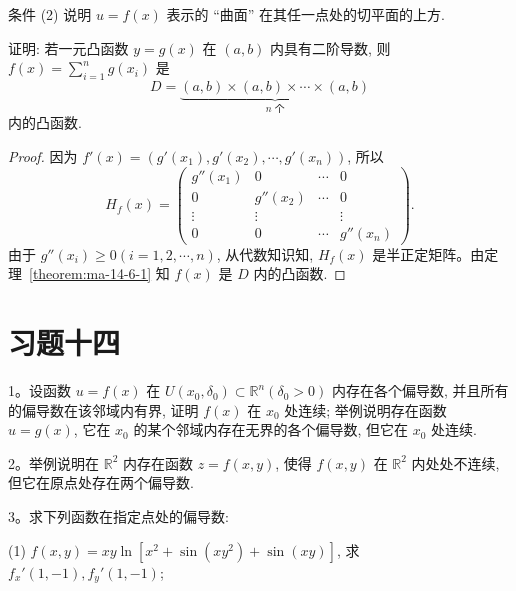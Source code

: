 \begin{remark}\label{remark:ma-14-source-122}
条件 (2) 说明 $u=f(x)$ 表示的 ``曲面'' 在其任一点处的切平面的上方.
\end{remark}


\begin{example}\label{example:ma-14-6-3}
证明: 若一元凸函数 $y=g(x)$ 在 $(a,b)$ 内具有二阶导数, 则 $f(x)=\displaystyle\sum_{i=1}^n g(x_i)$ 是
\[
  D=\underbrace{(a,b)\times(a,b)\times\cdots\times(a,b)}_{n\text{ 个}}
\]
内的凸函数.
\end{example}


\begin{proof}
因为 $f'(x)=(g'(x_1),g'(x_2),\cdots,g'(x_n))$, 所以
\[
  H_f(x)=
  \begin{pmatrix}
    g''(x_1) & 0 & \cdots & 0\\
    0 & g''(x_2) & \cdots & 0\\
    \vdots & \vdots & & \vdots\\
    0 & 0 & \cdots & g''(x_n)
  \end{pmatrix}.
\]
由于 $g''(x_i)\geqslant0(i=1,2,\cdots,n)$, 从代数知识知, $H_f(x)$ 是半正定矩阵。由定理~\ref{theorem:ma-14-6-1} 知 $f(x)$ 是 $D$ 内的凸函数.
\end{proof}


\section*{习题十四}
{}
\label{exercises:ma-14}

1。设函数 $u=f(x)$ 在 $U(x_0,\delta_0)\subset\mathbb R^n(\delta_0>0)$ 内存在各个偏导数, 并且所有的偏导数在该邻域内有界, 证明 $f(x)$ 在 $x_0$ 处连续; 举例说明存在函数 $u=g(x)$, 它在 $x_0$ 的某个邻域内存在无界的各个偏导数, 但它在 $x_0$ 处连续.

2。举例说明在 $\mathbb R^2$ 内存在函数 $z=f(x,y)$, 使得 $f(x,y)$ 在 $\mathbb R^2$ 内处处不连续, 但它在原点处存在两个偏导数.

3。求下列函数在指定点处的偏导数:

(1) $f(x,y)=xy\ln[x^2+\sin(xy^2)+\sin(xy)]$, 求 $f_x'(1,-1),f_y'(1,-1)$;

